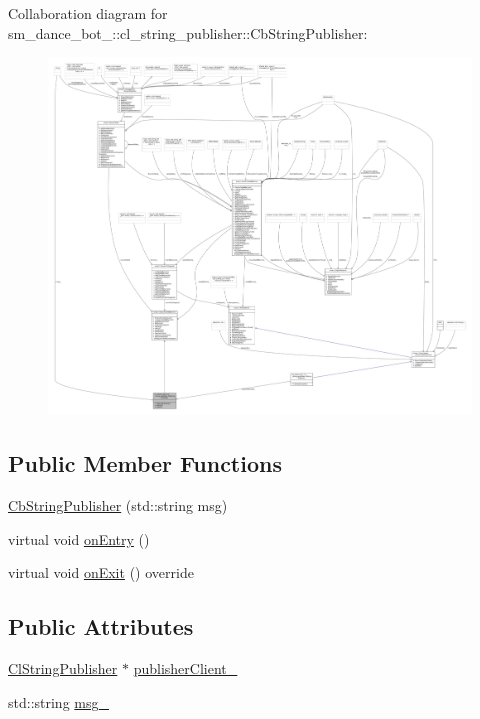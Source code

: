 Collaboration diagram for sm\+\_\+dance\+\_\+bot\+\_\+:\+:cl\+\_\+string\+\_\+publisher\+:\+:Cb\+String\+Publisher\+:
\nopagebreak
\begin{figure}[H]
\begin{center}
\leavevmode
\includegraphics[width=350pt]{classsm__dance__bot__2_1_1cl__string__publisher_1_1CbStringPublisher__coll__graph}
\end{center}
\end{figure}
\subsection*{Public Member Functions}
\begin{DoxyCompactItemize}
\item 
\hyperlink{classsm__dance__bot__2_1_1cl__string__publisher_1_1CbStringPublisher_a557c3ef581e3aa4d30ab4218b7d0f10b}{Cb\+String\+Publisher} (std\+::string msg)
\item 
virtual void \hyperlink{classsm__dance__bot__2_1_1cl__string__publisher_1_1CbStringPublisher_abc3c362ea55110f8d340e5cb4d901892}{on\+Entry} ()
\item 
virtual void \hyperlink{classsm__dance__bot__2_1_1cl__string__publisher_1_1CbStringPublisher_aee990acdb5ec33f1d22efafbe32216f2}{on\+Exit} () override
\end{DoxyCompactItemize}
\subsection*{Public Attributes}
\begin{DoxyCompactItemize}
\item 
\hyperlink{classsm__dance__bot__2_1_1cl__string__publisher_1_1ClStringPublisher}{Cl\+String\+Publisher} $\ast$ \hyperlink{classsm__dance__bot__2_1_1cl__string__publisher_1_1CbStringPublisher_a374db0f8b7ae20321f38c611108cb49a}{publisher\+Client\+\_\+}
\item 
std\+::string \hyperlink{classsm__dance__bot__2_1_1cl__string__publisher_1_1CbStringPublisher_aa4ec5323d074594371424668619997da}{msg\+\_\+}
\end{DoxyCompactItemize}


